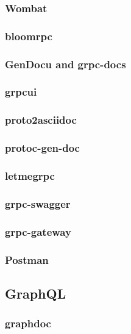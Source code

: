 \subsubsection{Wombat}

\subsubsection{bloomrpc}

\subsubsection{GenDocu and grpc-docs}

\subsubsection{grpcui}

\subsubsection{proto2asciidoc}

\subsubsection{protoc-gen-doc}

\subsubsection{letmegrpc}

\subsubsection{grpc-swagger}

\subsubsection{grpc-gateway}

\subsubsection{Postman}

\subsection{GraphQL}

\subsubsection{graphdoc}

